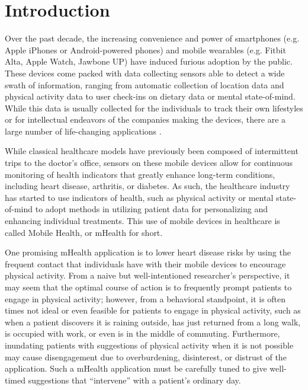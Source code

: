 \chapter{Introduction}
\label{introduction}

Over the past decade, the increasing convenience and power of smartphones (e.g. Apple iPhones or Android-powered phones) and mobile wearables (e.g. Fitbit Alta, Apple Watch, Jawbone UP) have induced furious adoption by the public.  These devices come packed with data collecting sensors able to detect a wide swath of information, ranging from automatic collection of location data and physical activity data to user check-ins on dietary data or mental state-of-mind.  While this data is usually collected for the individuals to track their own lifestyles or for intellectual endeavors of the companies making the devices, there are a large number of life-changing applications \citep{Ramkumar2017}.  

While classical healthcare models have previously been composed of intermittent trips to the doctor's office, sensors on these mobile devices allow for continuous monitoring of health indicators that greatly enhance long-term conditions, including heart disease, arthritis, or diabetes.  As such, the healthcare industry has started to use indicators of health, such as physical activity or mental state-of-mind to adopt methods in utilizing patient data for personalizing and enhancing individual treatments.  This use of mobile devices in healthcare is called Mobile Health, or mHealth for short.

One promising mHealth application is to lower heart disease risks by using the frequent contact that individuals have with their mobile devices to encourage physical activity.  From a naive but well-intentioned researcher's perspective, it may seem that the optimal course of action is to frequently prompt patients to engage in physical activity; however, from a behavioral standpoint, it is often times not ideal or even feasible for patients to engage in physical activity, such as when a patient discovers it is raining outside, has just returned from a long walk, is occupied with work, or even is in the middle of commuting.  Furthermore, inundating patients with suggestions of physical activity when it is not possible may cause disengagement due to overburdening, disinterest, or distrust of the application.  Such a mHealth application must be carefully tuned to give well-timed suggestions that ``intervene'' with a patient's ordinary day.  

